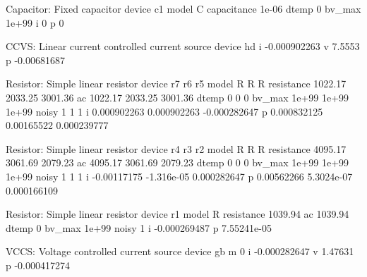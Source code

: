  Capacitor: Fixed capacitor
     device                    c1
      model                     C
capacitance                 1e-06
      dtemp                     0
     bv_max                 1e+99
          i                     0
          p                     0

 CCVS: Linear current controlled current source
     device                    hd
          i          -0.000902263
          v                7.5553
          p           -0.00681687

 Resistor: Simple linear resistor
     device                    r7                    r6                    r5
      model                     R                     R                     R
 resistance               1022.17               2033.25               3001.36
         ac               1022.17               2033.25               3001.36
      dtemp                     0                     0                     0
     bv_max                 1e+99                 1e+99                 1e+99
      noisy                     1                     1                     1
          i           0.000902263           0.000902263          -0.000282647
          p           0.000832125            0.00165522           0.000239777

 Resistor: Simple linear resistor
     device                    r4                    r3                    r2
      model                     R                     R                     R
 resistance               4095.17               3061.69               2079.23
         ac               4095.17               3061.69               2079.23
      dtemp                     0                     0                     0
     bv_max                 1e+99                 1e+99                 1e+99
      noisy                     1                     1                     1
          i           -0.00117175            -1.316e-05           0.000282647
          p            0.00562266            5.3024e-07           0.000166109

 Resistor: Simple linear resistor
     device                    r1
      model                     R
 resistance               1039.94
         ac               1039.94
      dtemp                     0
     bv_max                 1e+99
      noisy                     1
          i          -0.000269487
          p           7.55241e-05

 VCCS: Voltage controlled current source
     device                    gb
          m                     0
          i          -0.000282647
          v               1.47631
          p          -0.000417274

